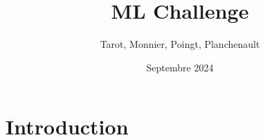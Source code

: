 \documentclass{article}
\begin{document}
\title{ML Challenge}
\author{Tarot, Monnier, Poingt, Planchenault}
\date{Septembre 2024}

\maketitle

\section{Introduction}
\end{document}
